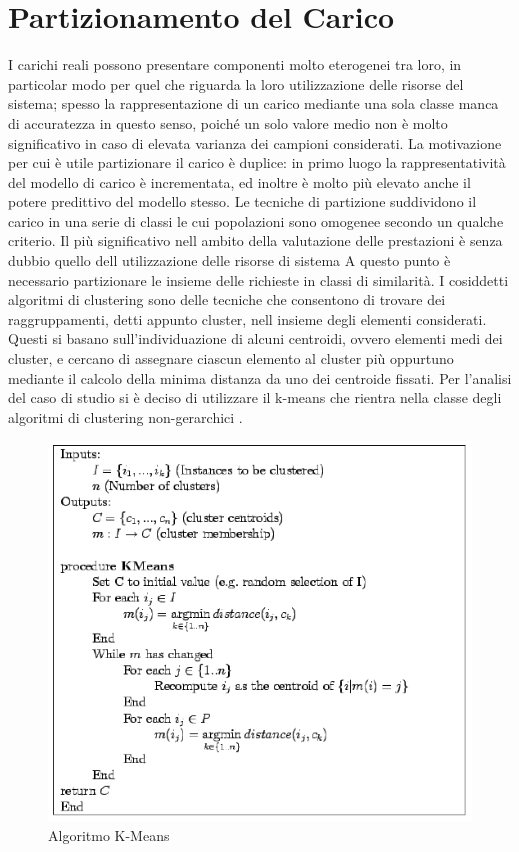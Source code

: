 \section{Partizionamento del Carico}
I carichi reali possono presentare componenti molto eterogenei tra loro, in particolar modo per quel 
che riguarda la loro utilizzazione delle risorse del sistema; spesso la rappresentazione di un carico 
mediante una sola classe manca di accuratezza in questo senso, poiché un solo valore medio non è 
molto significativo in caso di elevata varianza dei campioni considerati. 
La motivazione per cui è utile partizionare il carico è duplice: in primo luogo la rappresentatività 
del modello di carico è incrementata, ed inoltre è molto più elevato anche il potere predittivo del 
modello stesso. Le tecniche di partizione suddividono il carico in una serie di classi le cui 
popolazioni sono omogenee secondo un qualche criterio. Il più significativo nell ambito della 
valutazione delle prestazioni è senza dubbio quello dell utilizzazione delle risorse di sistema 
A questo punto è necessario partizionare le insieme delle richieste in classi di similarità. I cosiddetti 
algoritmi di clustering sono delle tecniche che consentono di trovare dei raggruppamenti, detti 
appunto cluster, nell insieme degli elementi considerati. Questi si basano sull'individuazione di 
alcuni centroidi, ovvero elementi medi dei cluster, e cercano di assegnare ciascun elemento al 
cluster più oppurtuno mediante il calcolo della minima distanza da uno dei centroide fissati. 
Per l'analisi del caso di studio si è deciso di utilizzare il k-means che rientra nella classe degli algoritmi di clustering non-gerarchici . 
\begin{figure}[H]
\begin{center}
\includegraphics[scale=0.71]{etc/kmeans.png}
\caption{Algoritmo K-Means}
\label{schema3}
\end{center}
\end{figure}
